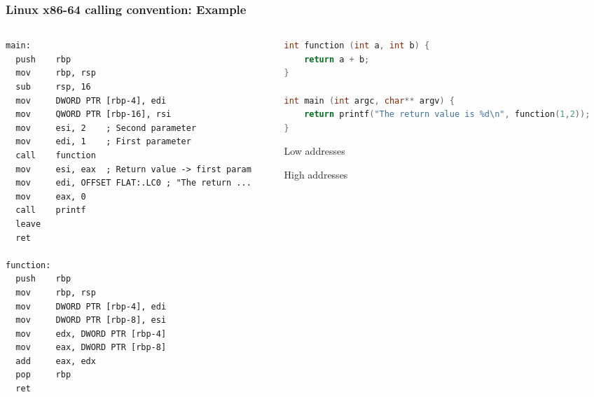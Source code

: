 \documentclass[]{beamer}
\begin{document}
\begin{frame}[fragile]
  \frametitle{Linux x86-64 calling convention: Example}
  \begin{columns}
    \begin{column}{.5\textwidth}
\begin{lstlisting}[language={[x86masm]Assembler},basicstyle=\tiny\ttfamily]
main:
  push    rbp
  mov     rbp, rsp
  sub     rsp, 16
  mov     DWORD PTR [rbp-4], edi
  mov     QWORD PTR [rbp-16], rsi
  mov     esi, 2    ; Second parameter
  mov     edi, 1    ; First parameter
  call    function
  mov     esi, eax  ; Return value -> first param
  mov     edi, OFFSET FLAT:.LC0 ; "The return ...
  mov     eax, 0
  call    printf
  leave
  ret

function:
  push    rbp
  mov     rbp, rsp
  mov     DWORD PTR [rbp-4], edi
  mov     DWORD PTR [rbp-8], esi
  mov     edx, DWORD PTR [rbp-4]
  mov     eax, DWORD PTR [rbp-8]
  add     eax, edx
  pop     rbp
  ret
\end{lstlisting}
    \end{column}

    \begin{column}{.5\textwidth}

\begin{lstlisting}[language=C,basicstyle=\tiny\ttfamily]
int function (int a, int b) {
    return a + b;
}

int main (int argc, char** argv) {
    return printf("The return value is %d\n", function(1,2));
}
\end{lstlisting}
	\vspace{-2em}
	\begin{center}
    	\par{\scriptsize Low addresses}\\[.5em]
	\par{\scriptsize High addresses}
	\end{center}
    \end{column}
  \end{columns}
\end{frame}
\end{document}
